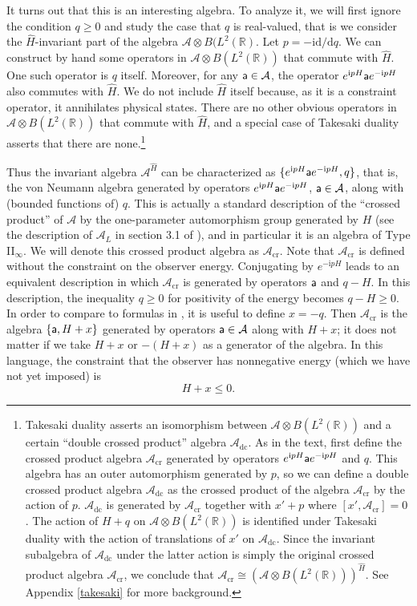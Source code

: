 \documentclass[11pt,a4paper]{article}
\def\a{{\sf a}}
\def\be{\begin{equation}}
\def\ee{\end{equation}}
\def\h{\widehat}
\def\A{{\mathcal A}}
\def\d{{\mathrm d}}
\def\R{{\mathbb R}}
\def\h{\widehat}
\def\i{{\mathrm i}}
\def\cr{{\mathrm{cr}}}
\begin{document}
It turns out that this is an interesting algebra.   To analyze it, we will first ignore the condition
$q\geq 0$ and study the case that $q$ is real-valued, that is we consider the $\h H$-invariant part of the algebra $\A \otimes B(L^2(\R)$.  Let $p=-\i \d/\d q$.   We can construct by hand some operators in $\A\otimes B(L^2(\R))$ that commute with $\h H$.   One such operator is $q$ itself.
Moreover, for any $\a\in\A$, the operator $e^{\i p H}\a e^{-\i p H}$ also commutes with $\h H$.   We do not include $\h H$ itself because, as it is a constraint
operator, it annihilates physical states.    There are no other obvious operators in $\A\otimes B(L^2(\R))$
that commute with $\h H$, and a special case of Takesaki duality \cite{Takesaki} asserts that there are none.\footnote{Takesaki duality asserts an isomorphism between $\A\otimes B(L^2(\R))$ and a certain ``double crossed product'' algebra $\A_{\mathrm{dc}}$. As in the text, first define the crossed product algebra $\A_\cr$ generated by operators $e^{\i p H}\a e^{-\i p H}$
and $q$.   This algebra has an outer automorphism generated by $p$, so we can define 
 a double crossed product algebra $\A_\mathrm{dc}$ as the crossed product of the algebra $\A_\cr$ by the action of $p$. $\A_{\mathrm{dc}}$  is generated by $\A_\cr$ together with $x' +p$ where $[x',\A_\cr] = 0$. The action of $H + q$  on $\A\otimes B(L^2(\R))$ is identified under Takesaki duality with the action of translations of $x'$ on $\A_\mathrm{dc}$. Since the invariant subalgebra of $\mathcal{A}_\mathrm{dc}$ under the latter action is simply the original crossed product algebra $\A_\cr$, we conclude that $\A_\cr \cong (\A\otimes B(L^2(\R)))^{\h H}$.  See Appendix \ref{takesaki} for more background.}

Thus the invariant algebra $\A^{\h H}$ can be characterized as $\{e^{\i p H}\a e^{-\i p H},q\}$, that is, the von Neumann algebra generated by operators
$e^{\i p H}\a e^{-\i p H}$, $\a\in\A$, along with (bounded functions of) $q$.   This is actually a standard description of the ``crossed product'' of $\A$ by the 
one-parameter automorphism group generated by $H$ (see the description of $\A_L$ in section 3.1 of  \cite{GCP}), and in particular it is an algebra of Type II$_\infty$. We will denote this crossed product algebra  as $\A_\cr$.   Note that $\A_\cr$ is defined without the constraint on the observer energy.
Conjugating by $e^{-\i p H}$ leads to an equivalent description in which $\A_\cr$ is generated by operators $\a$ and $q-H$.   
In this description, the inequality $q\geq 0$ for positivity of the energy becomes $q-H\geq 0$.
In order to compare to formulas in \cite{GCP}, it is useful to define $x=-q$.   Then $\A_\cr$ is the algebra $\{\a,H+x\}$ generated by
operators $\a\in\A$ along with $H+x$; it does not matter if we take $H+x$ or $-(H+x)$ as a generator of the algebra.   In this language, the constraint
that the observer has nonnegative energy (which we have not yet imposed) is
\be\label{zolbo} H+x\leq 0. \ee
\end{document}
